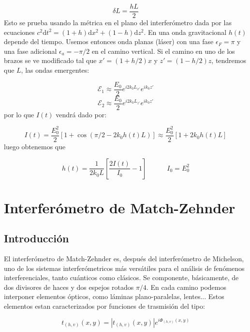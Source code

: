 \documentclass[12pt,a4paper]{book}
\numberwithin{equation}{section}
\numberwithin{figure}{section}
\newcommand{\tquad}{\quad \quad \quad}
\newcommand{\parentesis}[1]{\left( #1  \right)}
\newcommand{\ccorchetes}[1]{\left[ #1  \right]}
\newcommand{\D}{\mathrm{d}}
\newcommand{\1}{_{(1)}}
\newcommand{\2}{_{(2)}}
\newcommand{\Ecal}{\mathcal{E}}
\theoremstyle{definition}
\begin{document}
\begin{equation}
\delta L = \frac{hL}{2}
\end{equation}
Esto se prueba usando la métrica en el plano del interferómetro dada por las ecuaciones $c^2\D t^2 = (1+h)\D x^2 + (1-h) \D z^2$. En una onda gravitacional $h(t)$ depende del tiempo. Usemos entonces onda planas (láser) con una fase $\epsilon_F=\pi$ y una fase adicional $\epsilon_a=-\pi/2$ en el camino vertical. Si el camino en uno de los brazos se ve modificado tal que $x'=(1+h/2)x$ y $z'=(1-h/2)z$, tendremos que $L$, las ondas emergentes:

\begin{equation}
\Ecal_1 \approx \frac{E_0}{2} e^{i2k_0L_{x'}} e^{ik_0z'}
\end{equation}
\begin{equation}
\Ecal_2 \approx \frac{E_0}{2} e^{i2k_0 L_{z'}} e^{ik_0z'}
\end{equation}
por lo que $I(t)$ vendrá dado por:

\begin{equation}
I(t) = \frac{E_0^2}{2} \ccorchetes{1+ \cos \parentesis{\pi/2 - 2k_0 h(t)L}} \approx   \frac{E_0^2}{2} \ccorchetes{1 + 2k_0 h(t)L} 
\end{equation}
luego obtenemos que

\begin{equation}
h(t) = \frac{1}{2k_0 L} \ccorchetes{\frac{2I(t)}{I_0}-1} \tquad I_0 = E_0^2
\end{equation}



\section{Interferómetro de Match-Zehnder}
\subsection{Introducción}
El interferómetro de Match-Zehnder es, después del interferómetro de Michelson, uno de los sistemas interferómetricos más versátiles para el análisis de fenómenos interferenciales, tanto cuánticos como clásicos. Se componente, básicamente, de dos divisores de haces y dos espejos rotados $\pi/4$. En cada camino podemos interponer elementos ópticos, como láminas plano-paralelas, lentes... Estos elementos estan caracterizados por funciones de trasmisión del tipo:

\begin{equation}
t_{(h,v)}(x,y) = |t_{(h,v)} (x,y) | e^{i \Phi_{(h,v)} (x,y)}
\end{equation}
\end{document}
